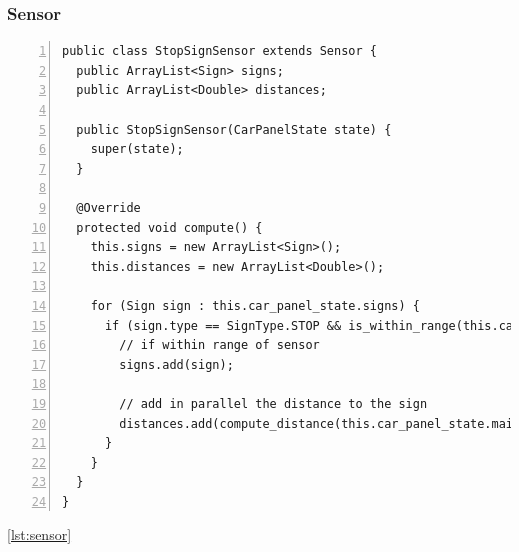 \documentclass{article} %
\begin{document}
\subsubsection{Sensor}
\begin{lstlisting}[float=*,caption={Implementation of Sensor},label={lst:sensor},numbers=left]
public class StopSignSensor extends Sensor {
  public ArrayList<Sign> signs;
  public ArrayList<Double> distances;

  public StopSignSensor(CarPanelState state) {
    super(state);
  }

  @Override
  protected void compute() {
    this.signs = new ArrayList<Sign>();
    this.distances = new ArrayList<Double>();

    for (Sign sign : this.car_panel_state.signs) {
      if (sign.type == SignType.STOP && is_within_range(this.car_panel_state.main_car, sign)) {
        // if within range of sensor
        signs.add(sign);

        // add in parallel the distance to the sign
        distances.add(compute_distance(this.car_panel_state.main_car, sign));
      }
    }
  }
}
\end{lstlisting}

\ref{lst:sensor}
\end{document}
